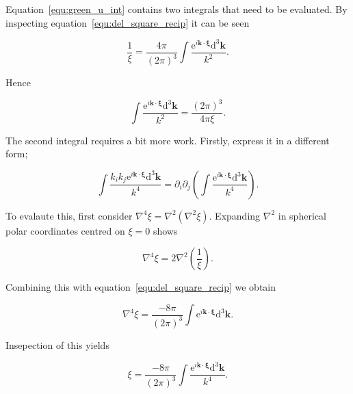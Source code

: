 \documentclass[12pt]{article}
\begin{document}
Equation~\ref{equ:green_u_int} contains two integrals that need to be evaluated. By inspecting equation~\ref{equ:del_square_recip} it can be seen

\begin{equation}
\label{equ:recip_int}
\frac{1}{\xi} = \frac{4 \pi}{(2 \pi)^{3}} \int \frac{\mathrm{e}^{i \boldsymbol{k} \cdot \boldsymbol{\xi}} \mathrm{d}^{3} \boldsymbol{k}}{k^{2}} .
\end{equation}

Hence

\begin{equation}
\label{equ:green_u_int1}
\int \frac{\mathrm{e}^{i \boldsymbol{k} \cdot \boldsymbol{\xi}} \mathrm{d}^{3} \boldsymbol{k}}{k^{2}} = \frac{(2 \pi)^{3}}{4 \pi \xi} .
\end{equation}

The second integral requires a bit more work. Firstly, express it in a different form;

\begin{equation}
\label{equ:green_u_int2_new}
\int \frac{k_{i} k_{j} \mathrm{e}^{i \boldsymbol{k} \cdot \boldsymbol{\xi}} \mathrm{d}^{3} \boldsymbol{k}}{k^{4}} = \partial_{i} \partial_{j} \left(\int \frac{\mathrm{e}^{i \boldsymbol{k} \cdot \boldsymbol{\xi}} \mathrm{d}^{3} \boldsymbol{k}}{k^{4}} \right) .
\end{equation}

To evalaute this, first consider $\nabla^{4} \xi = \nabla^{2}(\nabla^{2} \xi)$. Expanding $\nabla^{2}$ in spherical polar coordinates centred on $\xi = 0$ shows

\begin{equation}
\label{equ:del4}
\nabla^{4} \xi = 2 \nabla^{2} \left(\frac{1}{\xi}\right) .
\end{equation}

Combining this with equation~\ref{equ:del_square_recip} we obtain

\begin{equation}
\label{equ:del4_int}
\nabla^{4} \xi = \frac{-8 \pi}{(2 \pi)^{3}} \int \mathrm{e}^{i \boldsymbol{k} \cdot \boldsymbol{\xi}} \mathrm{d}^{3} \boldsymbol{k} .
\end{equation}

Insepection of this yields

\begin{equation}
\label{equ:del4_int_int}
\xi = \frac{-8 \pi}{(2 \pi)^{3}} \int \frac{\mathrm{e}^{i \boldsymbol{k} \cdot \boldsymbol{\xi}} \mathrm{d}^{3} \boldsymbol{k}}{k^{4}} .
\end{equation}
\end{document}

